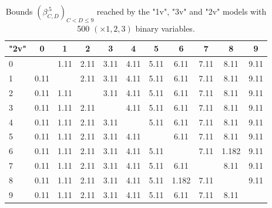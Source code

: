 \begin{table*}
\vspace{0.3cm}

	\begin{tabular}{|l||c|c|c|c|c|c|c|c|c|c|}\hline
		{\bf "2v"} & 0 & 1 & 2 & 3 & 4 & 5 & 6 & 7 & 8 & 9 \\\hline\hline
		0 &  & 1.11 & 2.11 & 3.11 & 4.11 & 5.11 & 6.11 & 7.11 & 8.11 & 9.11 \\\hline
		1 & 0.11 &  & 2.11 & 3.11 & 4.11 & 5.11 & 6.11 & 7.11 & 8.11 & 9.11 \\\hline
		2 & 0.11 & 1.11 & & 3.11 & 4.11 & 5.11 & 6.11 & 7.11 & 8.11 & 9.11 \\\hline
		3 & 0.11 & 1.11 & 2.11 & & 4.11 & 5.11 & 6.11 & 7.11 & 8.11 & 9.11 \\\hline
		4 & 0.11 & 1.11 & 2.11 & 3.11 & & 5.11 & 6.11 & 7.11 & 8.11 & 9.11 \\\hline
		5 & 0.11 & 1.11 & 2.11 & 3.11 & 4.11 & & 6.11 & 7.11 & 8.11 & 9.11 \\\hline
		6 & 0.11 & 1.11 & 2.11 & 3.11 & 4.11 & 5.11 & & 7.11 & 1.182 & 9.11 \\\hline
		7 & 0.11 & 1.11 & 2.11 & 3.11 & 4.11 & 5.11 & 6.11 & & 8.11 & 9.11 \\\hline
		8 & 0.11 & 1.11 & 2.11 & 3.11 & 4.11 & 5.11 & 1.182 & 7.11 &  & 9.11 \\\hline
		9 & 0.11 & 1.11 & 2.11 & 3.11 & 4.11 & 5.11 & 6.11 & 7.11 & 8.11 &  \\\hline
	\end{tabular}
	
	\caption{Bounds $(\beta^{.5}_{C,D})_{C < D \leq 9}$ 
	reached by the "1v", "3v" and "2v" models with 500 $(\times 1,2,3)$ binary variables.}
    \label{table.pair}
\end{table*}
